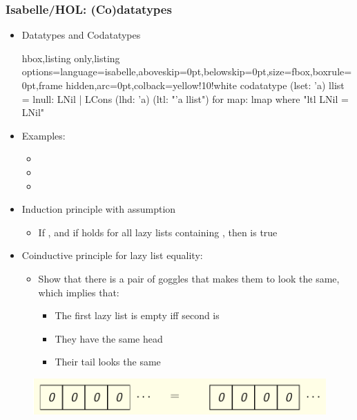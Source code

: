 \documentclass[aspectratio=169,10pt]{beamer}
\begin{document}
\begin{frame}
  \frametitle{Isabelle/HOL: (Co)datatypes}
  \begin{itemize}
    \item Datatypes and Codatatypes
\vspace*{-1ex}
          \begin{tcblisting}{hbox,listing only,listing options={language=isabelle,aboveskip=0pt,belowskip=0pt},size=fbox,boxrule=0pt,frame hidden,arc=0pt,colback=yellow!10!white}
codatatype (lset: 'a) llist = lnull: LNil | LCons (lhd: 'a) (ltl: "'a llist")
  for map: lmap where "ltl LNil = LNil"
          \end{tcblisting}
\vspace*{-1ex}
    \item Examples:
          \begin{itemize}
            \item {}
            \item {}
            \item {}
          \end{itemize}
\vspace*{-1ex}
    \item Induction principle with  assumption
          \begin{itemize}
            \item If , and if  holds for all lazy lists containing , then  is true
          \end{itemize}
    \item Coinductive principle for lazy list equality:
          \begin{itemize}
            \item Show that there is a pair of goggles that makes them to look the same, which implies that:
                  \begin{itemize}
                    \item The first lazy list is empty iff second is
                    \item They have the same head
                    \item Their tail looks the same
                  \end{itemize}
          \end{itemize}
  \end{itemize}
\vspace*{-1ex}
\begin{overlayarea}{\textwidth}{.45\textheight}
  \begin{figure}
    \centering
    \includegraphics[scale=0.3]{equality.png}
  \end{figure}
\end{overlayarea}
\end{frame}
\end{document}

